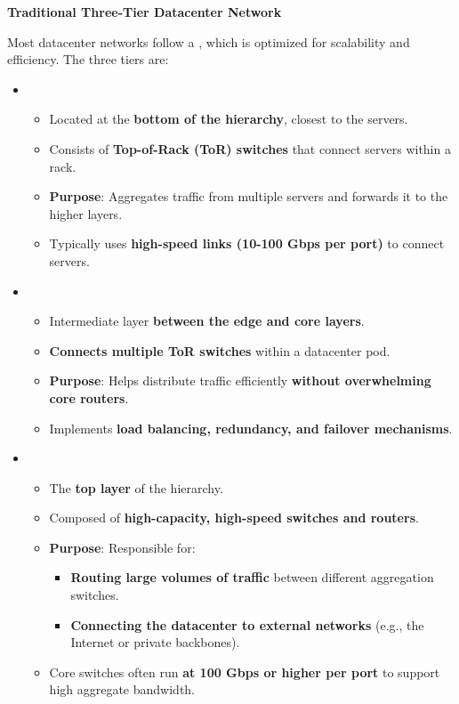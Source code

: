 \highspace
\begin{flushleft}
    \textcolor{Green3}{ \textbf{Traditional Three-Tier Datacenter Network}}
\end{flushleft}
Most datacenter networks follow a , which is optimized for scalability and efficiency. The three tiers are:
\begin{itemize}
    \item {}
    \begin{itemize}
        \item Located at the \textbf{bottom of the hierarchy}, closest to the servers.
        \item Consists of \textbf{Top-of-Rack (ToR) switches} that connect servers within a rack.
        \item[\textcolor{Green3}{\faIcon{check}}] \textcolor{Green3}{\textbf{Purpose}}: Aggregates traffic from multiple servers and forwards it to the higher layers.
        \item Typically uses \textbf{high-speed links (10-100 Gbps per port)} to connect servers.
    \end{itemize}


    \item {}
    \begin{itemize}
        \item Intermediate layer \textbf{between the edge and core layers}.
        \item \textbf{Connects multiple ToR switches} within a datacenter pod.
        \item[\textcolor{Green3}{\faIcon{check}}] \textcolor{Green3}{\textbf{Purpose}}: Helps distribute traffic efficiently \textbf{without overwhelming core routers}.
        \item Implements \textbf{load balancing, redundancy, and failover mechanisms}.
    \end{itemize}


    \item {}
    \begin{itemize}
        \item The \textbf{top layer} of the hierarchy.
        \item Composed of \textbf{high-capacity, high-speed switches and routers}.
        \item[\textcolor{Green3}{\faIcon{check}}] \textcolor{Green3}{\textbf{Purpose}}: Responsible for:
        \begin{itemize}
            \item \textbf{Routing large volumes of traffic} between different aggregation switches.
            \item \textbf{Connecting the datacenter to external networks} (e.g., the Internet or private backbones).
        \end{itemize}
        \item Core switches often run \textbf{at 100 Gbps or higher per port} to support high aggregate bandwidth.
    \end{itemize}
\end{itemize}
